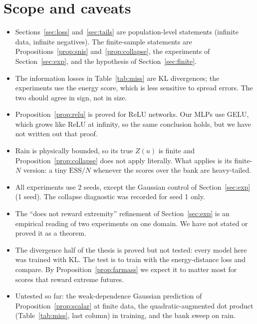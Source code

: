 \documentclass[11pt]{article}
\theoremstyle{plain}
\theoremstyle{definition}
\theoremstyle{remark}
\begin{document}
\section{Scope and caveats}

\begin{itemize}
\item Sections~\ref{sec:loss} and~\ref{sec:tails} are population-level statements (infinite
  data, infinite negatives). The finite-sample statements are Propositions~\ref{prop:snis}
  and~\ref{prop:collapse}, the experiments of Section~\ref{sec:exp}, and the hypothesis of
  Section~\ref{sec:finite}.
\item The information losses in Table~\ref{tab:miss} are KL divergences; the experiments use
  the energy score, which is less sensitive to spread errors. The two should agree in sign,
  not in size.
\item Proposition~\ref{prop:relu} is proved for ReLU networks. Our MLPs use GELU, which grows
  like ReLU at infinity, so the same conclusion holds, but we have not written out that proof.
\item Rain is physically bounded, so its true $Z(u)$ is finite and Proposition~\ref{prop:collapse}
  does not apply literally. What applies is its finite-$N$ version: a tiny $\mathrm{ESS}/N$
  whenever the scores over the bank are heavy-tailed.
\item All experiments use 2 seeds, except the Gaussian control of Section~\ref{sec:exp}
  (1 seed). The collapse diagnostic was recorded for seed 1 only.
\item The ``does not reward extremity'' refinement of Section~\ref{sec:exp} is an empirical
  reading of two experiments on one domain. We have not stated or proved it as a theorem.
\item The divergence half of the thesis is proved but not tested: every model here was
  trained with KL. The test is to train with the energy-distance loss and compare. By
  Proposition~\ref{prop:farmass} we expect it to matter most for scores that reward
  extreme futures.
\item Untested so far: the weak-dependence Gaussian prediction of
  Proposition~\ref{prop:scalar} at finite data, the quadratic-augmented dot product
  (Table~\ref{tab:miss}, last column) in training, and the bank sweep on rain.
\end{itemize}

\appendix
\end{document}
